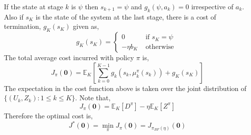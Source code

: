 \documentclass[onecolumn]{IEEEtran}
\begin{document}
If the state at stage $k$ is $\psi$ then $s_{k+1}=\psi$ and
$g_k(\psi,a_k)=0$ irrespective of $a_k$.  Also if $s_{K}$ is the state
of the system at the last stage, there is a cost of termination,
$g_{K}(s_K)$ given as,
\begin{equation*}
g_{K}(s_{K})=\left\{\begin{array}{ll}
                                0&\mbox{ if }s_{K} =\psi\\
                                -\eta b_{K}&\mbox{ otherwise }\end{array}\right.
\end{equation*}
The total average cost incurred with policy $\pi$ is, 
\begin{equation*}
J_{\pi}(\textbf{0})=\mathbb{E}_{K}\left[\sum_{k=0}^{K-1}g_k(s_k,\mu^{\pi}_k(s_k))+g_{K}(s_{K})\right]
\end{equation*}
The expectation in the cost function above is taken over the joint distribution of $\{({U}_k,Z_{k}):1\le k\le K\}$. Note that, 
 \begin{equation*}
J_{\pi}(\textbf{0})=\mathbb{E}_K[D^{\pi}]-\eta\mathbb{E}_K[Z^{\pi}]
 \end{equation*}
 Therefore the optimal cost is,
\begin{equation*}
J^{*}(\textbf{0})=\min_\pi J_\pi(\textbf{0})=J_{\pi_{BF}(\eta)}(\textbf{0})
\end{equation*}
\end{document}

